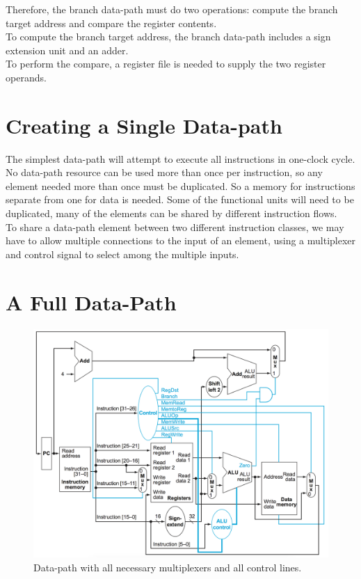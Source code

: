 \documentclass[12pt]{article}
\theoremstyle{definition}
\begin{document}
  Therefore, the branch data-path must do two operations: compute the branch target address and compare the register contents. \\
  To compute the branch target address, the branch data-path includes a sign extension unit and an adder. \\
  To perform the compare, a register file is needed to supply the two register operands.
  \newpage
  \section{Creating a Single Data-path}
  The simplest data-path will attempt to execute all instructions in one-clock cycle.
  No data-path resource can be used more than once per instruction, so any element needed more than once must be duplicated.
  So a memory for instructions separate from one for data is needed.
  Some of the functional units will need to be duplicated, many of the elements can be shared by different instruction flows. \\

  To share a data-path element between two different instruction classes, we may have to allow multiple connections to the input of an element, using a multiplexer and control signal to select among the multiple inputs.
  \newpage
  \section{A Full Data-Path}
  \begin{figure}[!htp]
    \centering
    \includegraphics[angle=90, width=1.0\textwidth]{pictures/fullDataPath.png}
    \caption{Data-path with all necessary multiplexers and all control lines.}
    \label{fullDataPath}
  \end{figure}
  \newpage
\end{document}
